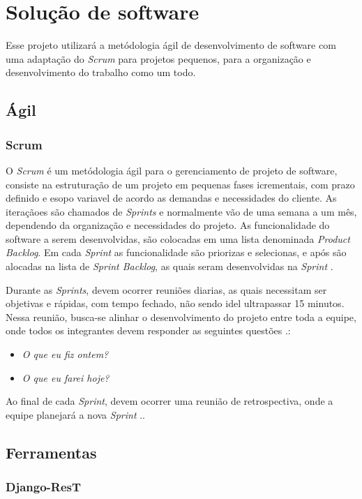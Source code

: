 \chapter[Solução de software]{Solução de software}
Esse projeto utilizará a metódologia ágil de desenvolvimento de software com uma adaptação do \textit{Scrum} para projetos pequenos, para a organização e desenvolvimento do trabalho como um todo.

\section{Ágil}
\subsection{Scrum}
O \textit{Scrum} é um metódologia ágil para o gerenciamento de projeto de software, consiste na estruturação de um projeto em pequenas fases icrementais, com prazo definido e esopo variavel de acordo as demandas e necessidades do cliente. As iteraçãoes são chamados de \textit{Sprints} e normalmente vão de uma semana a um mês, dependendo da organização e necessidades do projeto. As funcionalidade do software a serem desenvolvidas, são colocadas em uma lista denominada \textit{Product Backlog}. Em cada \textit{Sprint} as funcionalidade são priorizas e selecionas, e após são alocadas na lista de \textit{Sprint Backlog}, as quais seram desenvolvidas na \textit{Sprint} \cite{sutherland2016scrum}.

Durante as \textit{Sprints}, devem ocorrer reuniões diarias, as quais necessitam ser objetivas e rápidas, com tempo fechado, não sendo idel ultrapassar 15 minutos. Nessa reunião, busca-se alinhar o desenvolvimento do projeto entre toda a equipe, onde todos os integrantes devem responder as seguintes questões \cite{sutherland2016scrum}.:
\begin{itemize}
    \item \textit{O que eu fiz ontem?}
    \item \textit{O que eu farei hoje?}
\end{itemize}

Ao final de cada \textit{Sprint}, devem ocorrer uma reunião de retrospectiva, onde a equipe planejará a nova \textit{Sprint} \cite{sutherland2016scrum}..

\section{Ferramentas}
\subsection{Django-ResT}
